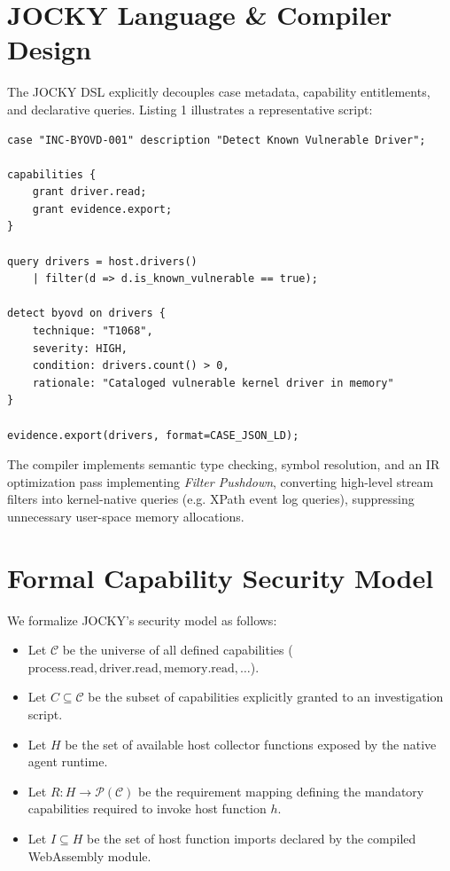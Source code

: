 \documentclass[10pt,conference]{IEEEtran}
\begin{document}
\section{JOCKY Language \& Compiler Design}
The JOCKY DSL explicitly decouples case metadata, capability entitlements, and declarative queries. Listing 1 illustrates a representative script:
\begin{lstlisting}[caption={BYOVD Detection in JOCKY DSL}]
case "INC-BYOVD-001" description "Detect Known Vulnerable Driver";

capabilities {
    grant driver.read;
    grant evidence.export;
}

query drivers = host.drivers()
    | filter(d => d.is_known_vulnerable == true);

detect byovd on drivers {
    technique: "T1068",
    severity: HIGH,
    condition: drivers.count() > 0,
    rationale: "Cataloged vulnerable kernel driver in memory"
}

evidence.export(drivers, format=CASE_JSON_LD);
\end{lstlisting}

The compiler implements semantic type checking, symbol resolution, and an IR optimization pass implementing \textit{Filter Pushdown}, converting high-level stream filters into kernel-native queries (e.g. XPath event log queries), suppressing unnecessary user-space memory allocations.

\section{Formal Capability Security Model}
We formalize JOCKY's security model as follows:
\begin{itemize}
    \item Let $\mathcal{C}$ be the universe of all defined capabilities ($\text{process.read}, \text{driver.read}, \text{memory.read}, \dots$).
    \item Let $C \subseteq \mathcal{C}$ be the subset of capabilities explicitly granted to an investigation script.
    \item Let $H$ be the set of available host collector functions exposed by the native agent runtime.
    \item Let $R: H \rightarrow \mathcal{P}(\mathcal{C})$ be the requirement mapping defining the mandatory capabilities required to invoke host function $h$.
    \item Let $I \subseteq H$ be the set of host function imports declared by the compiled WebAssembly module.
\end{itemize}
\end{document}

